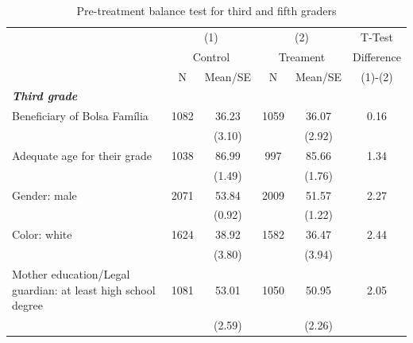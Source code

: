 \documentclass[
	article,			%
	12pt,				%
	oneside,			%
	a4paper,			%
	]{article}
\begin{document}
\begin{table}[h!]
  \centering
  \begin{threeparttable}
  \fontsize{9}{10}\selectfont
  \caption{Pre-treatment balance test for third and fifth graders}\label{tab:balance_adm1}
\begin{tabular*}{\textwidth}{@{\extracolsep{\fill}}lccccc@{}}
\toprule
           & \multicolumn{ 2}{c}{(1)} & \multicolumn{ 2}{c}{(2)} &     T-Test \\

           & \multicolumn{ 2}{c}{Control} & \multicolumn{ 2}{c}{Treament} & Difference \\

           &          N &    Mean/SE &          N &    Mean/SE &    (1)-(2) \\
\midrule
{\it {\bf Third grade}} &            &            &            &            &            \\

Beneficiary of Bolsa Família &       1082 &      36.23 &       1059 &      36.07 &       0.16 \\

           &            &     (3.10) &            &     (2.92) &            \\

Adequate age for their grade &       1038 &      86.99 &        997 &      85.66 &       1.34 \\

           &            &     (1.49) &            &     (1.76) &            \\

Gender: male &       2071 &      53.84 &       2009 &      51.57 &       2.27 \\

           &            &     (0.92) &            &     (1.22) &            \\

Color: white &       1624 &      38.92 &       1582 &      36.47 &       2.44 \\

           &            &     (3.80) &            &     (3.94) &            \\

Mother education/Legal guardian: at least high school degree &       1081 &      53.01 &       1050 &      50.95 &       2.05 \\

           &            &     (2.59) &            &     (2.26) &            \\


\end{tabular*}
\end{threeparttable}
\end{table}
\end{document}

